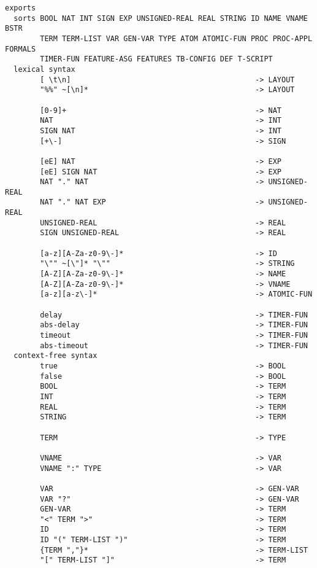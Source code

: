 \begin{verbatim}
exports
  sorts BOOL NAT INT SIGN EXP UNSIGNED-REAL REAL STRING ID NAME VNAME BSTR
        TERM TERM-LIST VAR GEN-VAR TYPE ATOM ATOMIC-FUN PROC PROC-APPL FORMALS
        TIMER-FUN FEATURE-ASG FEATURES TB-CONFIG DEF T-SCRIPT
  lexical syntax
        [ \t\n]                                          -> LAYOUT
        "%%" ~[\n]*                                      -> LAYOUT

        [0-9]+                                           -> NAT
        NAT                                              -> INT
        SIGN NAT                                         -> INT
        [+\-]                                            -> SIGN

        [eE] NAT                                         -> EXP
        [eE] SIGN NAT                                    -> EXP
        NAT "." NAT                                      -> UNSIGNED-REAL
        NAT "." NAT EXP                                  -> UNSIGNED-REAL
        UNSIGNED-REAL                                    -> REAL
        SIGN UNSIGNED-REAL                               -> REAL

        [a-z][A-Za-z0-9\-]*                              -> ID
        "\"" ~[\"]* "\""                                 -> STRING
        [A-Z][A-Za-z0-9\-]*                              -> NAME
        [A-Z][A-Za-z0-9\-]*                              -> VNAME
        [a-z][a-z\-]*                                    -> ATOMIC-FUN

        delay                                            -> TIMER-FUN
        abs-delay                                        -> TIMER-FUN
        timeout                                          -> TIMER-FUN
        abs-timeout                                      -> TIMER-FUN
  context-free syntax
        true                                             -> BOOL
        false                                            -> BOOL
        BOOL                                             -> TERM
        INT                                              -> TERM
        REAL                                             -> TERM
        STRING                                           -> TERM

        TERM                                             -> TYPE

        VNAME                                            -> VAR
        VNAME ":" TYPE                                   -> VAR

        VAR                                              -> GEN-VAR
        VAR "?"                                          -> GEN-VAR
        GEN-VAR                                          -> TERM
        "<" TERM ">"                                     -> TERM
        ID                                               -> TERM
        ID "(" TERM-LIST ")"                             -> TERM
        {TERM ","}*                                      -> TERM-LIST
        "[" TERM-LIST "]"                                -> TERM


\end{verbatim}

